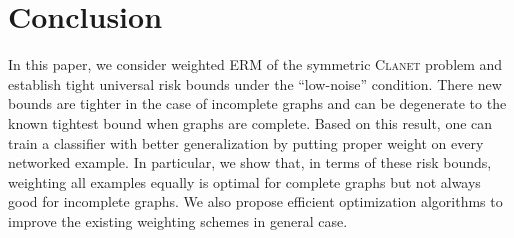 \documentclass[letterpaper]{article} %
\newcommand{\probdistri}{\mathbf{p}}
\newcommand{\problemabbr}{\textnormal{C}\textsc{lanet}}
\newcommand{\normo}[1]{\|#1\|_1}
\begin{document}


\section{Conclusion} %
\label{sec:conclusion}
In this paper, we consider weighted ERM of the symmetric \problemabbr{} problem and establish tight universal risk bounds under the ``low-noise'' condition. 
There new bounds are tighter in the case of incomplete graphs and can be degenerate to the known tightest  bound when graphs are complete. 
Based on this result, one can train a classifier with better generalization by putting proper weight on every networked example. 
In particular, we show that, in terms of these risk bounds, weighting all examples equally is optimal for complete graphs but not always good for incomplete graphs. 
We also propose efficient optimization algorithms to improve the existing weighting schemes in general case. 








\end{document}
